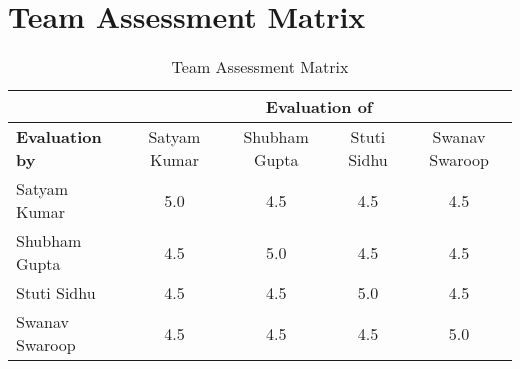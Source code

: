         \section{Team Assessment Matrix}
	        \begin{table}[h!]
	        	\begin{tabular}{| l | c | c | c | c |}
	        		\hline
	        		& \multicolumn{4}{c|}{\textbf{Evaluation of}} \\\hline
	        		\textbf{Evaluation by} & Satyam Kumar & Shubham Gupta & Stuti Sidhu & Swanav Swaroop \\
	        		\hline
	        		Satyam Kumar   & 5.0 & 4.5 & 4.5 & 4.5\\
	        		\hline
	        		Shubham Gupta  & 4.5 & 5.0 & 4.5 & 4.5\\
	        		\hline
	        		Stuti Sidhu    & 4.5 & 4.5 & 5.0 & 4.5 \\
	        		\hline
	        		Swanav Swaroop & 4.5 & 4.5 & 4.5 & 5.0 \\ [1ex] 
	        		\hline
	        	\end{tabular}
		        \caption{Team Assessment Matrix}
	        \end{table}
